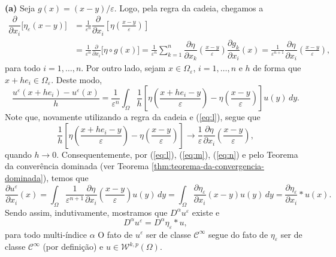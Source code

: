 \documentclass[a4paper, 11pt]{book}
\theoremstyle{definition}
\newcommand{\cC}{\mathcal{C}}
\newcommand{\cW}{\mathcal{W}}
\begin{document}
\begin{prf}
    ~

    \textbf{(a)} Seja $g(x) = (x-y)/\varepsilon $. Logo, pela regra da cadeia, chegamos a
    \begin{equation} \label{eq:l}
        \begin{aligned}
            \dfrac{\partial}{\partial x_i} \big[\eta_\varepsilon(x-y)\big] &= \frac{1}{\varepsilon^n}\dfrac{\partial }{\partial x_i}\left[\eta\left( \frac{x - y}{\varepsilon} \right) \right] \\
            &=\frac{1}{\varepsilon^n} \frac{\partial}{\partial x_i} \big[ \eta \circ g(x) \big]
            = \frac{1}{\varepsilon^n} \sum_{k =1}^n \dfrac{\partial \eta}{\partial x_k}\left( \frac{x - y}{\varepsilon} \right) \dfrac{\partial g_k}{\partial x_i}(x) = \frac{1}{\varepsilon^{n+1}} \dfrac{\partial \eta}{\partial x_i}\left( \frac{x - y}{\varepsilon} \right),
        \end{aligned}
    \end{equation}
    para todo $i = 1,\dots,n$. Por outro lado, sejam $x \in \Omega_\varepsilon$, $i = 1,\dots,n$ e $h$ de forma que $x + he_i \in \Omega_\varepsilon$. Deste modo,
    \begin{equation} \label{eq:m}
        \frac{u^\varepsilon(x + he_i) - u^\varepsilon(x)}{h} 
            = \frac{1}{\varepsilon^n} \int_\Omega \frac{1}{h}\left[  \eta\left( \frac{x + he_i - y}{\varepsilon} \right) - \eta\left( \frac{x -y}{\varepsilon} \right) \right] u(y) \,dy.
    \end{equation} 
    Note que, novamente utilizando a regra da cadeia e (\ref{eq:l}), segue que
    \begin{equation} \label{eq:n}
        \frac{1}{h}\left[  \eta\left( \frac{x + he_i - y}{\varepsilon} \right) - \eta\left( \frac{x -y}{\varepsilon} \right) \right] \to \frac{1}{\varepsilon}\dfrac{\partial \eta}{\partial x_i}\left( \frac{x - y}{\varepsilon} \right),
    \end{equation}
    quando $h \to 0$. Consequentemente, por (\ref{eq:l}), (\ref{eq:m}), (\ref{eq:n}) e pelo Teorema da converência dominada (ver Teorema \ref{thm:teorema-da-convergencia-dominada}), temos que
    \[
        \dfrac{\partial u^\varepsilon}{\partial x_i}(x) = \int_\Omega \frac{1}{\varepsilon^{n+1}} \dfrac{\partial \eta}{\partial x_i}\left( \frac{x - y}{\varepsilon} \right) u(y) \,dy = \int_\Omega \dfrac{\partial \eta_\varepsilon}{\partial x_i} (x-y) u(y) \,dy = \frac{\partial \eta_\varepsilon}{\partial x_i} * u(x).
    \]
    Sendo assim,
    indutivamente, mostramos que $D^\alpha u^\varepsilon$ existe e
    \[
        D^\alpha u^\varepsilon = D^\alpha\eta_\varepsilon * u,
    \]
    para todo multi-índice $\alpha$
    O fato de $u^\varepsilon$ ser de classe $\cC^\infty$ segue do fato de $\eta_\varepsilon$ ser de classe $\cC^\infty$ (por definição) e $u \in \cW^{k,p}(\Omega)$.


\end{prf}
\end{document}
